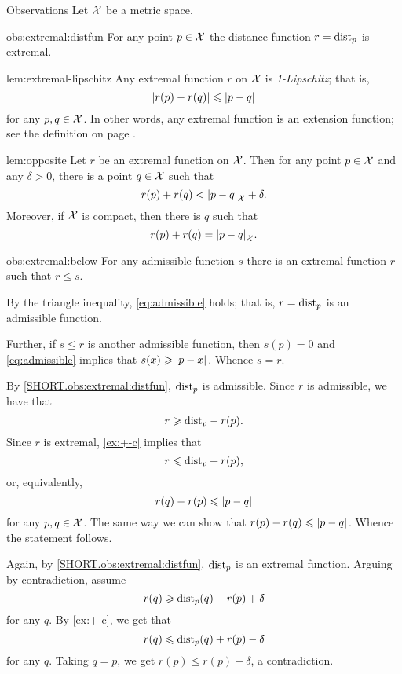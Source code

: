 \begin{thm}{Observations}\label{obs:extremal}
Let $\mathcal{X}$ be a metric space.

\begin{subthm}{obs:extremal:distfun}
For any point $p\in\mathcal{X}$
the distance function $r\z=\distfun_p$ is extremal.
\end{subthm}

\begin{subthm}{lem:extremal-lipschitz}
Any extremal function $r$ on $\mathcal{X}$ is \emph{1-Lipschitz};
that is,
\[|r(p)-r(q)|\le \dist{p}{q}{}\]
for any $p,q\in\mathcal{X}$.
In other words, any extremal function is an extension function; see the definition on page \pageref{page:extension function}.
\end{subthm}

\begin{subthm}{lem:opposite}
Let $r$ be an extremal function on $\mathcal{X}$.
Then for any point $p\in\mathcal{X}$ and any $\delta>0$, there is a point $q\in \mathcal{X}$
such that 
\[r(p)+r(q)<\dist{p}{q}{\spc{X}}+\delta.\]
Moreover, if $\mathcal{X}$ is compact, then there is $q$ such that 
\[r(p)+r(q)=\dist{p}{q}{\spc{X}}.\]
\end{subthm}


\begin{subthm}{obs:extremal:below}
For any admissible function $s$ there is an extremal function $r$ such that $r\le s$.
\end{subthm}

\end{thm}

By the triangle inequality, \ref{eq:admissible} holds;
that is, $r=\mathrm{dist}_p$ is an admissible function.

Further, if $s\le r$ is another admissible function, then $s(p)=0$ and \ref{eq:admissible} implies that $s(x)\z\ge\dist{p}{x}{}$.
Whence $s=r$.

By \ref{SHORT.obs:extremal:distfun}, $\mathrm{dist}_p$ is admissible.
Since $r$ is admissible, we have that
\[r\geqslant \mathrm{dist}_p-r(p).\]
Since $r$ is extremal, \ref{ex:+-c} implies that
\[r\leqslant \mathrm{dist}_p+r(p),\]
or, equivalently,
\[r(q)-r(p)\le \dist{p}{q}{}\]
for any $p,q\in\mathcal{X}$.
The same way we can show that
$r(p)-r(q)\le \dist{p}{q}{}$.
Whence the statement follows.

Again, by \ref{SHORT.obs:extremal:distfun}, $\mathrm{dist}_p$ is an extremal function.
Arguing by contradiction, assume 
\[r(q)\geqslant \mathrm{dist}_p(q)-r(p)+\delta\]
for any $q$.
By \ref{ex:+-c}, we get that
\[r(q)\leqslant \mathrm{dist}_p(q)+r(p)-\delta\]
for any $q$.
Taking $q=p$, we get $r(p)\le r(p)-\delta$, a contradiction.

